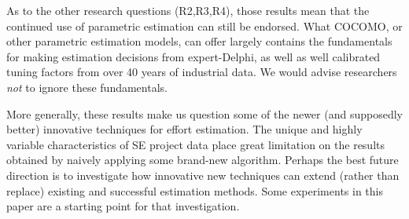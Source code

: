 \documentclass{sig-alternate}
\begin{document}
As to the other research questions (R2,R3,R4), those results mean that 
the continued
use of parametric estimation can still be endorsed.
What COCOMO, or other parametric
estimation models, can offer largely contains the
fundamentals for making estimation decisions
from expert-Delphi, as well as well calibrated
tuning factors from over 40 years of
industrial data.  We would advise
researchers {\em not} to ignore these fundamentals.

More generally, these results make us question 
some of the newer (and supposedly better) innovative techniques for effort estimation.  
The unique and highly variable characteristics of SE
project data place great limitation on the results
obtained by naively applying some brand-new
algorithm.  Perhaps the best future direction is to
investigate how innovative new techniques can extend
(rather than replace) existing and successful
estimation methods.  Some experiments in this paper
are a starting point for that investigation.
\end{document}
